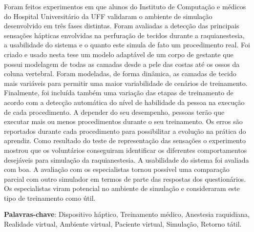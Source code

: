 \begin{resumo}
Foram feitos experimentos em que alunos do Instituto de Computação e médicos do Hospital Universitário da UFF validaram o ambiente de simulação desenvolvido em três fases distintas. Foram avaliadas a detecção das principais sensações hápticas envolvidas na perfuração de tecidos durante a raquianestesia, a usabilidade do sistema e o quanto este simula de fato um procedimento real. Foi criado e usado nesta tese um modelo adaptável de um corpo de gestante que possui modelagem de todas as camadas desde a pele das costas até os ossos da coluna vertebral. Foram modeladas, de forma dinâmica, as camadas de tecido mais variáveis para permitir uma maior variabilidade de cenários de treinamento. Finalmente, foi incluída também uma variação das etapas de treinamento de acordo com a detecção automática do nível de habilidade da pessoa na execução de cada procedimento. A depender do seu desempenho, pessoas terão que executar mais ou menos procedimentos durante o seu treinamento. Os erros são reportados durante cada procedimento para possibilitar a evolução na prática do aprendiz. Como resultado do teste de representação das sensações o experimento mostrou que os voluntários conseguiram identificar os diferentes comportamentos desejáveis para simulação da raquianestesia. A usabilidade do sistema foi avaliada com boa. A avaliação com os especialistas tornou possível uma comparação parcial com outro simulador em termos de parte das respostas dos questionários. Os especialistas viram potencial no ambiente de simulação e consideraram este tipo de treinamento como útil. 

{\hspace{-8mm} \bf{Palavras-chave}}: Dispositivo háptico, Treinamento médico, Anestesia raquidiana, Realidade virtual, Ambiente virtual, Paciente virtual, Simulação, Retorno tátil.

\end{resumo}

